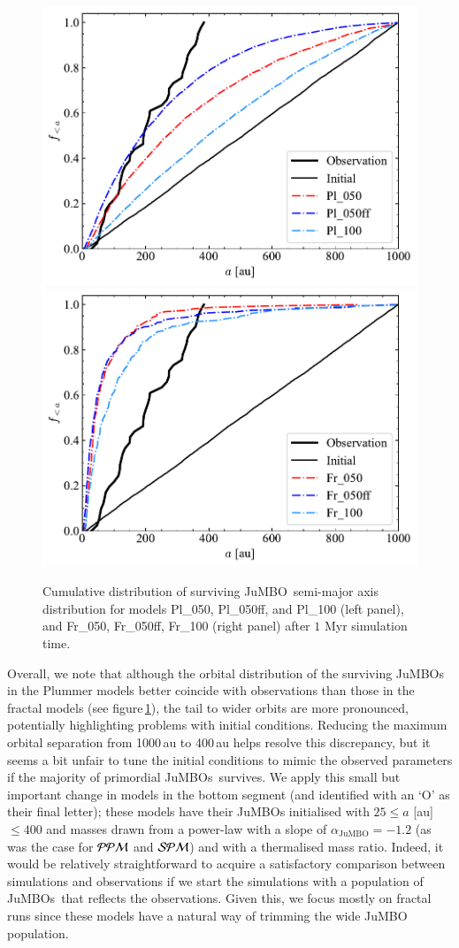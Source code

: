\documentclass[submission,phys]{lib/SciPost}
\newcommand{\jumbo}{\mbox{JuMBO}}
\newcommand{\jumbos}{\mbox{JuMBOs}}
\begin{document}
\begin{figure}
    \centering
    \includegraphics[width=0.49\columnwidth]{figures/Plummer_General_sem_axis.pdf}
    \includegraphics[width=0.49\columnwidth]{figures/Fractal_General_sem_axis.pdf}
    \caption{Cumulative distribution of surviving \jumbo\, semi-major
      axis distribution for models Pl\_050, Pl\_050ff, and Pl\_100
      (left panel), and Fr\_050, Fr\_050ff, Fr\_100 (right panel) after $1$ Myr simulation time.}
    \label{Fig:Gen_Semi_Plummer}
    \label{Fig:Gen_Semi_Fractal}
\end{figure}

Overall, we note that although the orbital distribution of the
surviving \jumbos\, in the Plummer models better coincide with
observations than those in the fractal models (see
figure\,\ref{Fig:Gen_Semi_Fractal}), the tail to wider orbits are more
pronounced, potentially highlighting problems with initial conditions.
Reducing the maximum orbital separation from 1000\,au to 400\,au helps
resolve this discrepancy, but it seems a bit unfair to tune the
initial conditions to mimic the observed parameters if the majority of
primordial \jumbos\ survives.  We apply this small but important
change in models in the bottom segment (and identified with an `O' as
their final letter); these models have their JuMBOs initialised with
$25\leq a$ [au]$\leq 400$ and masses drawn from a power-law with a
slope of $\alpha_{\jumbo} =-1.2$ (as was the case for ${\cal PPM}$ and
${\cal SPM}$) and with a thermalised mass ratio.  Indeed, it would be
relatively straightforward to acquire a satisfactory comparison
between simulations and observations if we start the simulations with
a population of \jumbos\, that reflects the observations. Given this,
we focus mostly on fractal runs since these models have a natural way
of trimming the wide JuMBO population.
      
\end{document}
